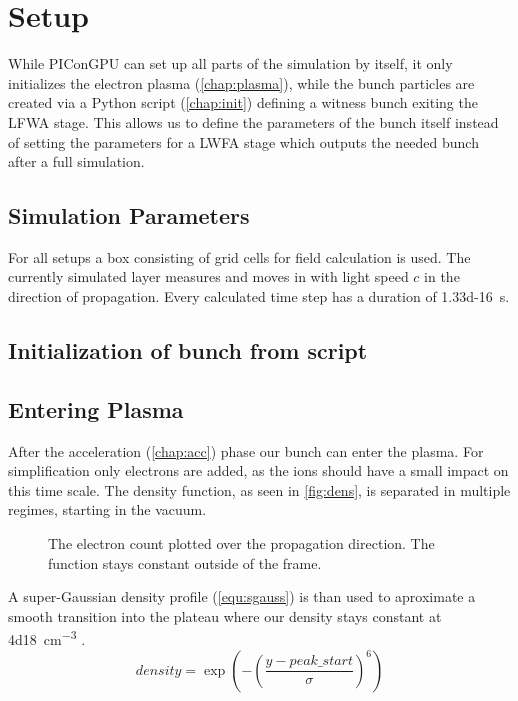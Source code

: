 \documentclass[bachelor_thesis]{subfiles}
\begin{document}
\chapter{Setup}
While PIConGPU can set up all parts of the simulation by itself, it only initializes the electron plasma (\autoref{chap:plasma}), while the bunch particles are created via a Python script (\autoref{chap:init}) defining a witness bunch exiting the LFWA stage.
This allows us to define the parameters of the bunch itself instead of setting the parameters for a LWFA stage which outputs the needed bunch after a full simulation.

\section{Simulation Parameters}
For all setups a box consisting of  grid cells for field calculation is used. The currently simulated layer measures  and moves in with light speed $c$ in the direction of propagation.
Every calculated time step has a duration of \qty{1.33d-16}{\s}. 



\section{Initialization of bunch from script}\label{chap:init}






\section{Entering Plasma}\label{chap:plasma}
 After the acceleration (\autoref{chap:acc}) phase our bunch can enter the plasma. For simplification only electrons are added, as the ions should have a small impact on this time scale.
The density function, as seen in \autoref{fig:dens}, is separated in multiple regimes, starting in the vacuum. 
\begin{figure}
\missingfigure{}
\caption{The electron count plotted over the propagation direction. The function stays constant outside of the frame.}\label{fig:dens}
\end{figure}
A super-Gaussian density profile (\autoref{equ:sgauss})  is than used to aproximate a smooth transition into the plateau where our density stays constant at \qty{4d18}{\cm^{-3}} \cite{Schoebel2022}. 
\begin{equation}
density = \exp\left(-\left(\frac{y-peak\_start}{\sigma}\right)^6\right)
\label{equ:sgauss}
\end{equation}
\end{document}
